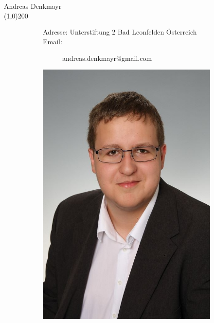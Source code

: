 \documentclass[FIPLY_base.tex]{subfiles}
\begin{document}
	\ \\
	\ \\
	{\Large Andreas Denkmayr}
	\ \\
	\line(1,0){200}
	\begin{figure}[H]
		\begin{subfigure}[b]{0.3\textwidth}
			Adresse: \newline
			Unterstiftung 2  Bad Leonfelden \newline
			Österreich \newline
			\newline
			Email:
			\begin{subfigure}[b]{0.2\textwidth}
				andreas.denkmayr@gmail.com
			\end{subfigure}
			\newline
			\newline
			\newline
			\newline
			\newline
		\end{subfigure}
		\hfil
		\begin{subfigure}[b]{0.2\textwidth}
			\includegraphics[scale=0.2]{img/senki}
		\end{subfigure}
	\end{figure}
\end{document}
